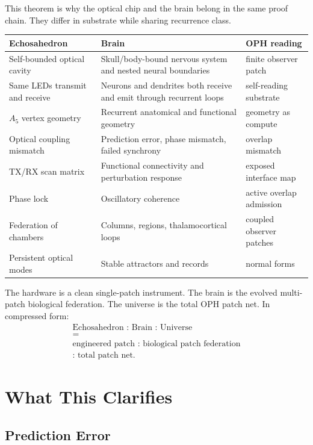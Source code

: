 \documentclass[11pt]{article}
\theoremstyle{remark}
\theoremstyle{plain}
\begin{document}
This theorem is why the optical chip and the brain belong in the same proof
chain. They differ in substrate while sharing recurrence class.

\begin{longtable}{L{0.28\textwidth}L{0.30\textwidth}L{0.32\textwidth}}
\toprule
\textbf{Echosahedron} & \textbf{Brain} & \textbf{OPH reading} \\
\midrule
\endhead
Self-bounded optical cavity & Skull/body-bound nervous system and nested neural boundaries & finite observer patch \\
Same LEDs transmit and receive & Neurons and dendrites both receive and emit through recurrent loops & self-reading substrate \\
\(A_5\) vertex geometry & Recurrent anatomical and functional geometry & geometry as compute \\
Optical coupling mismatch & Prediction error, phase mismatch, failed synchrony & overlap mismatch \\
TX/RX scan matrix & Functional connectivity and perturbation response & exposed interface map \\
Phase lock & Oscillatory coherence & active overlap admission \\
Federation of chambers & Columns, regions, thalamocortical loops & coupled observer patches \\
Persistent optical modes & Stable attractors and records & normal forms \\
\bottomrule
\end{longtable}

The hardware is a clean single-patch instrument. The brain is the evolved multi-patch biological federation. The universe is the total OPH patch net. In compressed form:
\[
\boxed{
\begin{gathered}
\text{Echosahedron : Brain : Universe}\\
=\\
\text{engineered patch : biological patch federation}\\
\text{: total patch net}.
\end{gathered}
}
\]

\section{What This Clarifies}

\subsection{Prediction Error}
\end{document}
